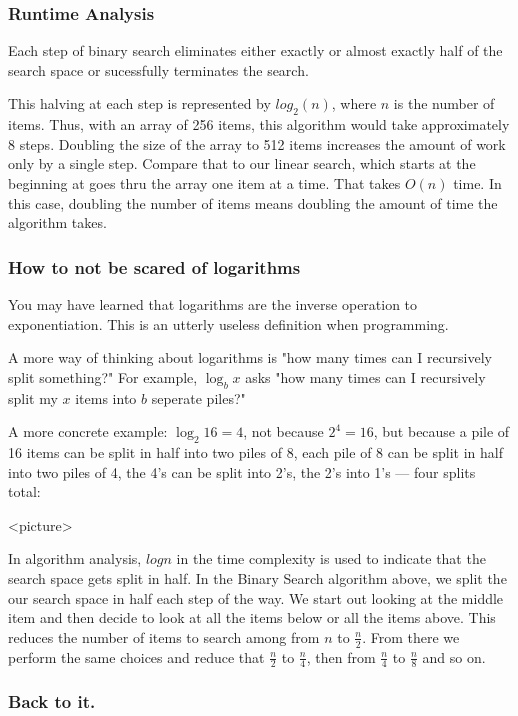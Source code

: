 \subsubsection{Runtime Analysis}
Each step of binary search eliminates either exactly or almost exactly half of the search space or sucessfully terminates the search.

This halving at each step is represented by $log_2(n)$, where $n$ is the number of items.  Thus, with an array of 256 items, this algorithm would take approximately 8 steps. Doubling the size of the array to 512 items increases the amount of work only by a single step.   Compare that to our linear search, which starts at the beginning at goes thru the array one item at a time.  That takes $O(n)$ time.  In this case, doubling the number of items means doubling the amount of time the algorithm takes.





\subsubsection{How to not be scared of logarithms }
You may have learned that logarithms are the inverse operation to exponentiation.
This is an utterly useless definition when programming.


A more way of thinking about logarithms is "how many times can I recursively split something?"
For example, $\log_b x$ asks "how many times can I recursively split my $x$ items into $b$ seperate piles?"

A more concrete example: $\log_2 16 = 4$, not because $2^4 = 16$, but because a pile of 16 items can be split in half into two piles of 8, each pile of 8 can be split in half into two piles of 4, the 4's can be split into 2's, the 2's into 1's --- four splits total:

<picture>


In algorithm analysis, $log n$ in the time complexity is used to indicate that the search space gets split in half.
In the Binary Search algorithm above, we split the our search space in half each step of the way.  We start out looking at the middle item and then decide to look at all the items below or all the items above.  This reduces the number of items to search among from $n$ to $\frac{n}{2}$.  From there we perform the same choices and reduce that $\frac{n}{2}$ to $\frac{n}{4}$, then from  $\frac{n}{4}$ to  $\frac{n}{8}$ and so on.

\subsubsection{Back to it.}

